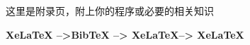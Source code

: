 \Appendix
这里是附录页，附上你的程序或必要的相关知识

\bf\heiti\color{red}{若要生成目录和参考文献的编译方式:} \color{black}XeLaTeX -->BibTeX --> XeLaTeX--> XeLaTeX
